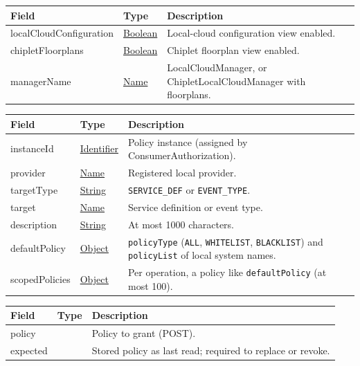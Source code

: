\documentclass[a4paper]{arrowhead}
\newcommand{\mref}[2][]{{\textcolor{ArrowheadPurple}{\hyperref[sec:model:#2]{\ifstrempty{#1}{#2}{#1}}}}}
\newcommand{\pref}[1]{{\textcolor{ArrowheadGrey}{\hyperref[sec:model:primitives:#1]{#1}}}}
\begin{document}

\noindent\begin{tabularx}{\textwidth}{| >{\raggedright\arraybackslash}p{3.9cm} | >{\raggedright\arraybackslash\small}p{5.3cm} | X |} \hline
\rowcolor{gray!33} Field & Type & Description \\ \hline
localCloudConfiguration & \pref{Boolean} & Local-cloud configuration view enabled. \\ \hline
chipletFloorplans & \pref{Boolean} & Chiplet floorplan view enabled. \\ \hline
managerName & \pref{Name} & LocalCloudManager, or ChipletLocalCloudManager with floorplans. \\ \hline
\end{tabularx}



\noindent\begin{tabularx}{\textwidth}{| >{\raggedright\arraybackslash}p{3.9cm} | >{\raggedright\arraybackslash\small}p{5.3cm} | X |} \hline
\rowcolor{gray!33} Field & Type & Description \\ \hline
instanceId & \pref{Identifier} & Policy instance (assigned by Consumer\allowbreak{}Authorization). \\ \hline
provider & \pref{Name} & Registered local provider. \\ \hline
targetType & \pref{String} & \texttt{SERVICE\_DEF} or \texttt{EVENT\_TYPE}. \\ \hline
target & \pref{Name} & Service definition or event type. \\ \hline
description & \pref{String} & At most 1000 characters. \\ \hline
defaultPolicy & \pref{Object} & \texttt{policyType} (\texttt{ALL}, \texttt{WHITELIST}, \texttt{BLACKLIST}) and \texttt{policyList} of local system names. \\ \hline
scopedPolicies & \pref{Object} & Per operation, a policy like \texttt{defaultPolicy} (at most 100). \\ \hline
\end{tabularx}



\noindent\begin{tabularx}{\textwidth}{| >{\raggedright\arraybackslash}p{3.9cm} | >{\raggedright\arraybackslash\small}p{5.3cm} | X |} \hline
\rowcolor{gray!33} Field & Type & Description \\ \hline
policy & \mref{ManagementPolicy} & Policy to grant (POST). \\ \hline
expected & \mref{ManagementPolicy} & Stored policy as last read; required to replace or revoke. \\ \hline
\end{tabularx}
\end{document}

